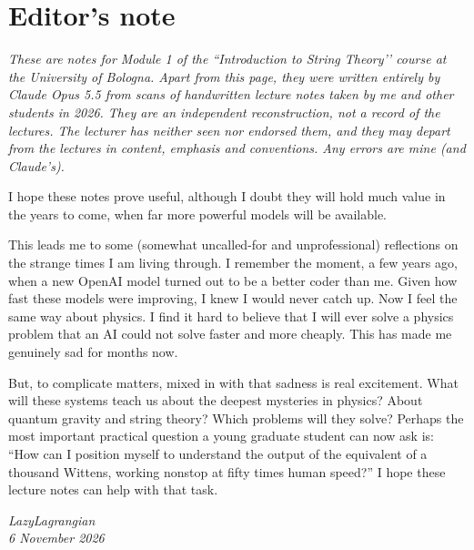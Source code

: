 \chapter*{Editor's note}

{\itshape\setlength{\parskip}{1.2ex}\setlength{\parindent}{0pt}%
These are notes for Module 1 of the ``Introduction to String Theory’’ course at the University of Bologna. Apart from this page,
they were written entirely by Claude Opus 5.5 from scans of handwritten lecture notes taken by me and other students in 2026.
They are an independent reconstruction, not a record of the lectures.
The lecturer has neither seen nor endorsed them, and they may depart from the lectures in content, emphasis and conventions.
Any errors are mine (and Claude’s).

I hope these notes prove useful, although I doubt they will hold much value in the years to come, when far more powerful
models will be available.

This leads me to some (somewhat uncalled-for and unprofessional) reflections on the strange times
I am living through. I remember the moment, a few years ago, when a new OpenAI model turned out to be a better coder than me.
Given how fast these models were improving, I knew I would never catch up.
Now I feel the same way about physics. I find it hard to believe that I will ever solve a physics problem that an AI
could not solve faster and more cheaply. This has made me genuinely sad for months now.

But, to complicate matters, mixed in with that sadness is real excitement. What will these systems teach us
about the deepest mysteries in physics? About quantum gravity and string theory? Which problems
will they solve? Perhaps the most important practical question a young graduate student can now ask is: ``How can I
position myself to understand the output of the equivalent of a thousand Wittens, working nonstop at fifty times human speed?''
I hope these lecture notes can help with that task.
 \par}

\par\bigskip
\begin{flushright}
  \textit{LazyLagrangian}\\
  \textit{6 November 2026}
\end{flushright}
